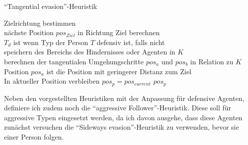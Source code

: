 \begin{algorithm} [H]
	\caption{"`Tangential evasion"'-Heuristik}
	\label{alg:TangentialEvasion}
	
	\TangentialEvasionHeuristic{} {
		Zielrichtung bestimmen \\
		nächste Position $pos_{Ziel}$ in Richtung Ziel berechnen \\
		$T_d$ ist \True wenn Typ der Person $T$ defensiv ist, \False falls nicht \\
		 {
			speichern des Bereichs des Hindernisses oder Agenten in $K$ \\
			berechnen der tangentialen Umgehungschritte $pos_a$ und $pos_b$ in Relation zu $K$  \\
			Position $pos_a$ ist die Position mit geringerer Distanz zum Ziel \\
			 {
				 {
					In aktueller Position verbleiben $pos_p = pos_{current}$
				} 
			} 
		} 
		\Return $pos_p$
	}
\end{algorithm}
 
Neben den vorgestellten Heuristiken mit der Anpassung für defensive Agenten, definiere ich zudem noch die "`aggressive Follower"'-Heuristik. Diese soll für aggressive Typen eingesetzt werden, da ich davon ausgehe, dass diese Agenten zunächst versuchen die "`Sideways evasion"'-Heuristik zu verwenden, bevor sie einer Person folgen.

